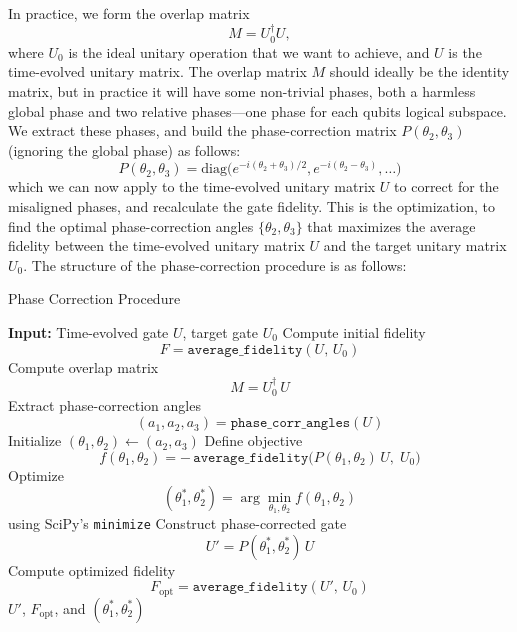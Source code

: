 \documentclass{subfiles}
\begin{document}
In practice, we form the overlap matrix 
\begin{equation*}
  M = U_0^\dagger U,
\end{equation*}
where $U_0$ is the ideal unitary operation that we want to achieve, and $U$ is the time-evolved unitary matrix. The overlap matrix $M$ should ideally be the identity matrix, but in practice it will have some non-trivial phases, both a harmless global phase and two relative phases—one phase for each qubits logical subspace. We extract these phases, and build the phase-correction matrix $P(\theta_2, \theta_3)$ (ignoring the global phase) as follows:
\begin{equation*}
    P(\theta_2, \theta_3) = \text{diag}\bigg(e^{-i(\theta_2 + \theta_3)/2}, e^{-i(\theta_2 - \theta_3)},\dots\bigg)
\end{equation*}
which we can now apply to the time-evolved unitary matrix $U$ to correct for the misaligned phases, and recalculate the gate fidelity. This is the optimization, to find the optimal phase-correction angles $\{\theta_2, \theta_3\}$ that maximizes the average fidelity between the time-evolved unitary matrix $U$ and the target unitary matrix $U_0$.
The structure of the phase-correction procedure is as follows:
\begin{algorithm}[H]
\caption{Phase Correction Procedure}
\label{alg:phase_correction}
\begin{algorithmic}[1]
  \State \textbf{Input:} Time-evolved gate $U$, target gate $U_0$
  \State Compute initial fidelity 
    \[
      F = \texttt{average\_fidelity}(U,\,U_0)
    \]
  \State Compute overlap matrix 
    \[
      M = U_{0}^{\dagger}\,U
    \]
  \State Extract phase-correction angles 
    \[
      (a_1,a_2,a_3) = \texttt{phase\_corr\_angles}(U)
    \]
  \State Initialize $(\theta_1,\theta_2) \leftarrow (a_2,a_3)$
  \State Define objective
    \[
      f(\theta_1,\theta_2)
      = -\,\texttt{average\_fidelity}\bigl(P(\theta_1,\theta_2)\,U,\;U_0\bigr)
    \]
  \State Optimize 
    \[
      (\theta_1^*,\theta_2^*)
      = \arg\min_{\theta_1,\theta_2} f(\theta_1,\theta_2)
    \]
    using SciPy's \texttt{minimize}
  \State Construct phase-corrected gate
    \[
      U' = P(\theta_1^*,\theta_2^*) \, U
    \]
  \State Compute optimized fidelity 
    \[
      F_{\mathrm{opt}} = \texttt{average\_fidelity}(U',\,U_0)
    \]
  \State \Return $U'$, $F_{\mathrm{opt}}$, and $(\theta_1^*,\theta_2^*)$
\end{algorithmic}
\end{algorithm}
\end{document}
